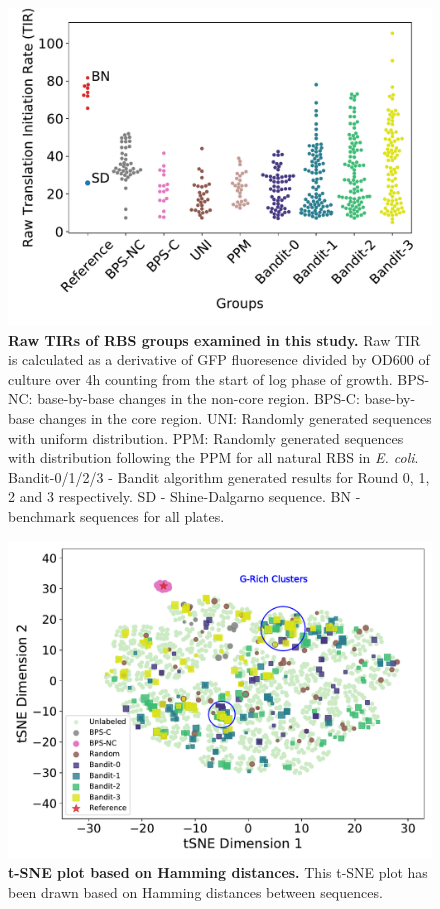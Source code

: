 \documentclass{scrartcl}[2013/05/29]%
\begin{document}
\begin{figure}[!ht]
    \centering
    \includegraphics[scale = 0.4]{plots/Supplementary/swarmplot_raw.pdf}
    \caption{
    \textbf{Raw TIRs of RBS groups examined in this study.}
    Raw TIR is calculated as a derivative of GFP fluoresence divided by OD600 of culture over 4h counting from the start of log phase of growth. 
    BPS-NC: base-by-base changes in the non-core region. 
    BPS-C: base-by-base changes in the core region. 
    UNI: Randomly generated sequences with uniform distribution. 
    PPM: Randomly generated sequences with distribution following the PPM for all natural RBS in \emph{E. coli}. 
    Bandit-0/1/2/3 - Bandit algorithm generated results for Round 0, 1, 2 and 3 respectively.
    SD - Shine-Dalgarno sequence.
    BN - benchmark sequences for all plates. 
    }
    \label{fig:rawswarmplots.}
\end{figure}

\begin{figure}[!ht]
   \centering
    \includegraphics[scale=0.5]{plots/Supplementary/tsneplot_hamming.pdf}
   \caption{\textbf{t-SNE plot based on Hamming distances.} This t-SNE plot has been drawn based on Hamming distances between sequences. 
    }
   \label{fig: TSNE hamming}
\end{figure}
\end{document}

